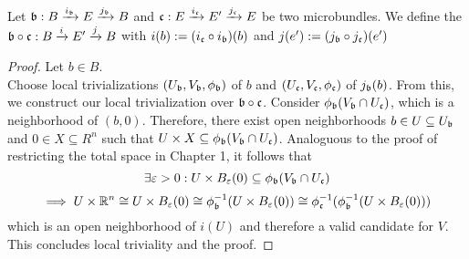 \\ Let $\bundledef{\bb}{B}{E}{i_\bb}{j_\bb}$ and $\bundledef{\bc}{E}{E'}{i_\bc}{j_\bc}$ be two microbundles.
We define the  $\bundledef{\bb \circ \bc}{B}{E'}{i}{j}$ with $i(b) := (i_\bc \circ i_\bb)(b)$ and $j(e') := (j_\bb \circ j_\bc)(e')$
\begin{proof}
Let $b \in B$. \\
Choose local trivializations $(U_\bb, V_\bb, \phi_\bb)$ of $b$ and $(U_\bc, V_\bc, \phi_\bc)$ of $j_\bb(b)$.
From this, we construct our local trivialization over $\bb \circ \bc$.
Consider $\phi_\bb(V_\bb \cap U_\bc)$, which is a neighborhood of $(b, 0)$.
Therefore, there exist open neighborhoods $b \in U \subseteq U_\bb$ and $0 \in X \subseteq R^n$ such that $U \times X \subseteq \phi_\bb(V_\bb \cap U_\bc)$.
Analoguous to the proof of restricting the total space in Chapter 1, it follows that
\[ \exists \varepsilon > 0: U \times B_\varepsilon(0) \subseteq \phi_\bb(V_\bb \cap U_\bc) \]
\[ \implies U \times \R^n \cong U \times B_\varepsilon(0) \cong \phi_\bb^{-1}(U \times B_\varepsilon(0)) \cong \phi_\bc^{-1}(\phi_\bb^{-1}(U \times B_\varepsilon(0))) \]
which is an open neighborhood of $i(U)$ and therefore a valid candidate for $V$.
This concludes local triviality and the proof.
\end{proof}